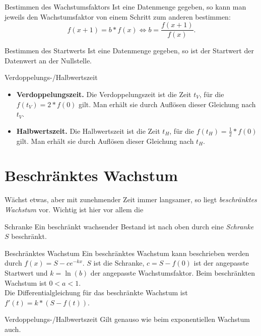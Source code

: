 \begin{bla}{Bestimmen des Wachstumsfaktors}
  Ist eine Datenmenge gegeben, so kann man jeweils den Wachstumsfaktor von einem Schritt zum anderen bestimmen:
  \begin{equation*}
    f(x+1)=b*f(x) \Leftrightarrow b=\frac{f(x+1)}{f(x)}.
  \end{equation*}
\end{bla}

\begin{bla}{Bestimmen des Startwerts}
  Ist eine Datenmenge gegeben, so ist der Startwert der Datenwert an der Nullstelle.
\end{bla}

\begin{bla}{Verdoppelungs-/Halbwertszeit}
  \begin{itemize}
    \item \textbf{Verdoppelungszeit.} Die Verdoppelungszeit ist die Zeit $t_V$, für die $f(t_V)=2*f(0)$ gilt. Man erhält sie durch Auflösen dieser Gleichung nach $t_V$.
    \item \textbf{Halbwertszeit.} Die Halbwertszeit ist die Zeit $t_H$, für die $f(t_H)= \tfrac{1}{2}*f(0)$ gilt. Man erhält sie durch Auflösen dieser Gleichung nach $t_H$.
  \end{itemize}
\end{bla}

\section{Beschränktes Wachstum}

Wächst etwas, aber mit zunehmender Zeit immer langsamer, so liegt \emph{beschränktes Wachstum} vor. Wichtig ist hier vor allem die

\begin{bla}{Schranke}
  Ein beschränkt wachsender Bestand ist nach oben durch eine \emph{Schranke} $S$ beschränkt.
\end{bla}

\begin{bla}{Beschränktes Wachstum}
  Ein beschränktes Wachstum kann beschrieben werden durch $f(x)=S-ce^{-kx}$. $S$ ist die Schranke, $c=S-f(0)$ ist der angepasste Startwert und $k=\ln(b)$ der angepasste Wachstumsfaktor. Beim beschränkten Wachstum ist $0<a<1$.\\
  Die Differentialgleichung für das beschränkte Wachstum ist $f'(t)=k*(S-f(t))$.
\end{bla}

\begin{bla}{Verdoppelungs-/Halbwertszeit}
  Gilt genauso wie beim exponentiellen Wachstum auch.
\end{bla}



